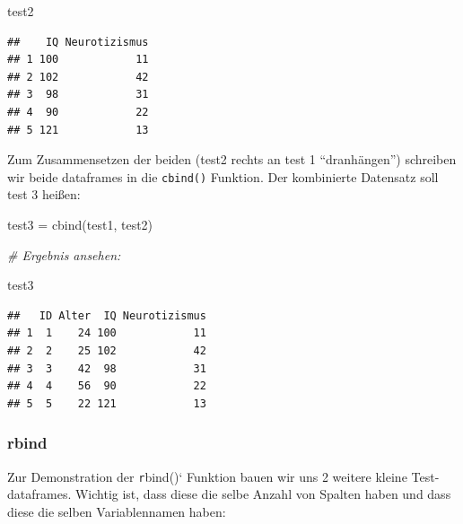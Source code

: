 \documentclass[
]{book}
\newenvironment{Shaded}{\begin{snugshade}}{\end{snugshade}}
\newcommand{\CommentTok}[1]{\textcolor[rgb]{0.56,0.35,0.01}{\textit{#1}}}
\newcommand{\FunctionTok}[1]{\textcolor[rgb]{0.00,0.00,0.00}{#1}}
\newcommand{\NormalTok}[1]{#1}
\newcommand{\OtherTok}[1]{\textcolor[rgb]{0.56,0.35,0.01}{#1}}
\begin{document}
\begin{Shaded}
\begin{Highlighting}[]
\NormalTok{test2}
\end{Highlighting}
\end{Shaded}

\begin{verbatim}
##    IQ Neurotizismus
## 1 100            11
## 2 102            42
## 3  98            31
## 4  90            22
## 5 121            13
\end{verbatim}

Zum Zusammensetzen der beiden (test2 rechts an test 1 ``dranhängen'') schreiben wir beide dataframes in die \texttt{cbind()} Funktion. Der kombinierte Datensatz soll test 3 heißen:

\begin{Shaded}
\begin{Highlighting}[]
\NormalTok{test3 }\OtherTok{=} \FunctionTok{cbind}\NormalTok{(test1, test2)}

\CommentTok{\# Ergebnis ansehen:}

\NormalTok{test3}
\end{Highlighting}
\end{Shaded}

\begin{verbatim}
##   ID Alter  IQ Neurotizismus
## 1  1    24 100            11
## 2  2    25 102            42
## 3  3    42  98            31
## 4  4    56  90            22
## 5  5    22 121            13
\end{verbatim}

\hypertarget{rbind}{%
\subsubsection{rbind}\label{rbind}}

Zur Demonstration der \texttt{r}bind()` Funktion bauen wir uns 2 weitere kleine Test-dataframes. Wichtig ist, dass diese die selbe Anzahl von Spalten haben und dass diese die selben Variablennamen haben:
\end{document}
